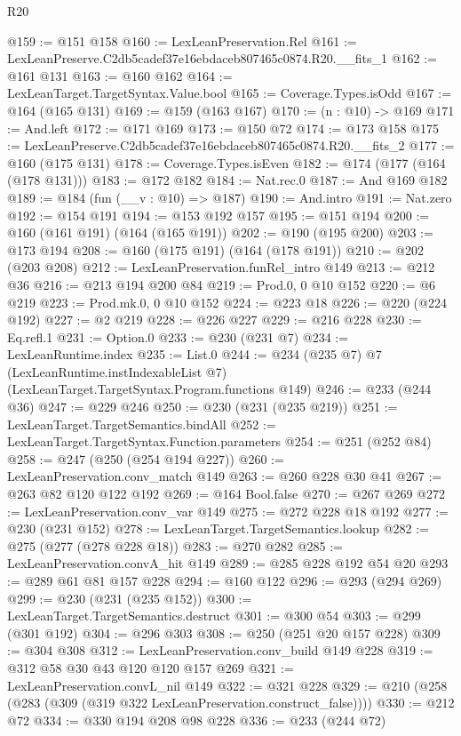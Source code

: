\begin{lexlean}{R20}
\begin{coremodule}
@159 := @151 @158
@160 := LexLeanPreservation.Rel
@161 := LexLeanPreserve.C2db5cadef37e16ebdaceb807465c0874.R20.__fits_1
@162 := @161 @131
@163 := @160 @162
@164 := LexLeanTarget.TargetSyntax.Value.bool
@165 := Coverage.Types.isOdd
@167 := @164 (@165 @131)
@169 := @159 (@163 @167)
@170 := (n : @10) -> @169
@171 := And.left
@172 := @171 @169
@173 := @150 @72
@174 := @173 @158
@175 := LexLeanPreserve.C2db5cadef37e16ebdaceb807465c0874.R20.__fits_2
@177 := @160 (@175 @131)
@178 := Coverage.Types.isEven
@182 := @174 (@177 (@164 (@178 @131)))
@183 := @172 @182
@184 := Nat.rec.{0}
@187 := And @169 @182
@189 := @184 (fun (__v : @10) => @187)
@190 := And.intro
@191 := Nat.zero
@192 := @154 @191
@194 := @153 @192 @157
@195 := @151 @194
@200 := @160 (@161 @191) (@164 (@165 @191))
@202 := @190 (@195 @200)
@203 := @173 @194
@208 := @160 (@175 @191) (@164 (@178 @191))
@210 := @202 (@203 @208)
@212 := LexLeanPreservation.funRel_intro @149
@213 := @212 @36
@216 := @213 @194 @200 @84
@219 := Prod.{0, 0} @10 @152
@220 := @6 @219
@223 := Prod.mk.{0, 0} @10 @152
@224 := @223 @18
@226 := @220 (@224 @192)
@227 := @2 @219
@228 := @226 @227
@229 := @216 @228
@230 := Eq.refl.{1}
@231 := Option.{0}
@233 := @230 (@231 @7)
@234 := LexLeanRuntime.index
@235 := List.{0}
@244 := @234
    (@235 @7)
    @7
    (LexLeanRuntime.instIndexableList @7)
    (LexLeanTarget.TargetSyntax.Program.functions @149)
@246 := @233 (@244 @36)
@247 := @229 @246
@250 := @230 (@231 (@235 @219))
@251 := LexLeanTarget.TargetSemantics.bindAll
@252 := LexLeanTarget.TargetSyntax.Function.parameters
@254 := @251 (@252 @84)
@258 := @247 (@250 (@254 @194 @227))
@260 := LexLeanPreservation.conv_match @149
@263 := @260 @228 @30 @41
@267 := @263 @82 @120 @122 @192
@269 := @164 Bool.false
@270 := @267 @269
@272 := LexLeanPreservation.conv_var @149
@275 := @272 @228 @18 @192
@277 := @230 (@231 @152)
@278 := LexLeanTarget.TargetSemantics.lookup
@282 := @275 (@277 (@278 @228 @18))
@283 := @270 @282
@285 := LexLeanPreservation.convA_hit @149
@289 := @285 @228 @192 @54 @20
@293 := @289 @61 @81 @157 @228
@294 := @160 @122
@296 := @293 (@294 @269)
@299 := @230 (@231 (@235 @152))
@300 := LexLeanTarget.TargetSemantics.destruct
@301 := @300 @54
@303 := @299 (@301 @192)
@304 := @296 @303
@308 := @250 (@251 @20 @157 @228)
@309 := @304 @308
@312 := LexLeanPreservation.conv_build @149 @228
@319 := @312 @58 @30 @43 @120 @120 @157 @269
@321 := LexLeanPreservation.convL_nil @149
@322 := @321 @228
@329 := @210 (@258 (@283 (@309 (@319 @322 LexLeanPreservation.construct_false))))
@330 := @212 @72
@334 := @330 @194 @208 @98 @228
@336 := @233 (@244 @72)

\end{coremodule}
\end{lexlean}

